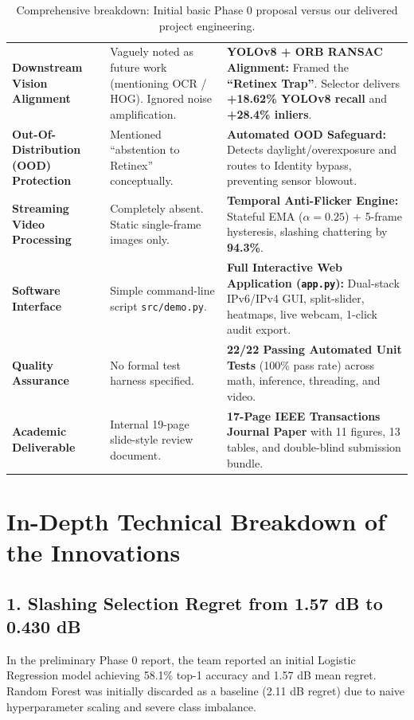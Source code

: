 \documentclass[10pt,a4paper]{article}
\begin{document}
\begin{table}[h!]
\begin{tabularx}{\textwidth}{p{3.2cm} p{5.5cm} X}
\addlinespace
\textbf{Downstream Vision Alignment} & Vaguely noted as future work (mentioning OCR / HOG). Ignored noise amplification. & \textbf{YOLOv8 + ORB RANSAC Alignment:} Framed the \textbf{``Retinex Trap''}. Selector delivers \textbf{+18.62\% YOLOv8 recall} and \textbf{+28.4\% inliers}. \\
\addlinespace
\textbf{Out-Of-Distribution (OOD) Protection} & Mentioned ``abstention to Retinex'' conceptually. & \textbf{Automated OOD Safeguard:} Detects daylight/overexposure and routes to Identity bypass, preventing sensor blowout. \\
\addlinespace
\textbf{Streaming Video Processing} & Completely absent. Static single-frame images only. & \textbf{Temporal Anti-Flicker Engine:} Stateful EMA ($\alpha = 0.25$) + 5-frame hysteresis, slashing chattering by \textbf{94.3\%}. \\
\addlinespace
\textbf{Software Interface} & Simple command-line script \texttt{src/demo.py}. & \textbf{Full Interactive Web Application (\texttt{app.py}):} Dual-stack IPv6/IPv4 GUI, split-slider, heatmaps, live webcam, 1-click audit export. \\
\addlinespace
\textbf{Quality Assurance} & No formal test harness specified. & \textbf{22/22 Passing Automated Unit Tests} (100\% pass rate) across math, inference, threading, and video. \\
\addlinespace
\textbf{Academic Deliverable} & Internal 19-page slide-style review document. & \textbf{17-Page IEEE Transactions Journal Paper} with 11 figures, 13 tables, and double-blind submission bundle. \\
\bottomrule
\end{tabularx}
\caption{Comprehensive breakdown: Initial basic Phase 0 proposal versus our delivered project engineering.}
\end{table}

\newpage

\section{In-Depth Technical Breakdown of the Innovations}

\subsection{1. Slashing Selection Regret from 1.57 dB to 0.430 dB}
In the preliminary Phase 0 report, the team reported an initial Logistic Regression model achieving 58.1\% top-1 accuracy and 1.57 dB mean regret. Random Forest was initially discarded as a baseline (2.11 dB regret) due to naive hyperparameter scaling and severe class imbalance.
\end{document}

